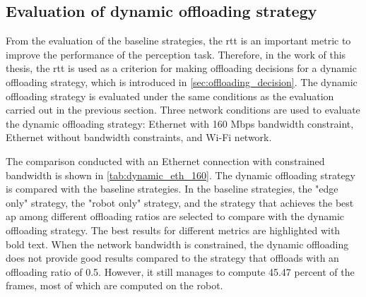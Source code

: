 
\subsection{Evaluation of dynamic offloading strategy}

 From the evaluation of the baseline strategies, the \gls{rtt} is an important metric to improve the performance of the perception task. Therefore, in the work of this thesis, the \gls{rtt} is used as a criterion for making offloading decisions for a dynamic offloading strategy, which is introduced in \cref{sec:offloading_decision}. The dynamic offloading strategy is evaluated under the same conditions as the evaluation carried out in the previous section. Three network conditions are used to evaluate the dynamic offloading strategy: Ethernet with 160 Mbps bandwidth constraint, Ethernet without bandwidth constraints, and Wi-Fi network. 

 The comparison conducted with an Ethernet connection with constrained bandwidth is shown in \cref{tab:dynamic_eth_160}. The dynamic offloading strategy is compared with the baseline strategies. In the baseline strategies, the "edge only" strategy, the "robot only" strategy, and the strategy that achieves the best \gls{ap} among different offloading ratios are selected to compare with the dynamic offloading strategy. The best results for different metrics are highlighted with bold text. When the network bandwidth is constrained, the dynamic offloading does not provide good results compared to the strategy that offloads with an offloading ratio of 0.5. However, it still manages to compute 45.47 percent of the frames, most of which are computed on the robot.

